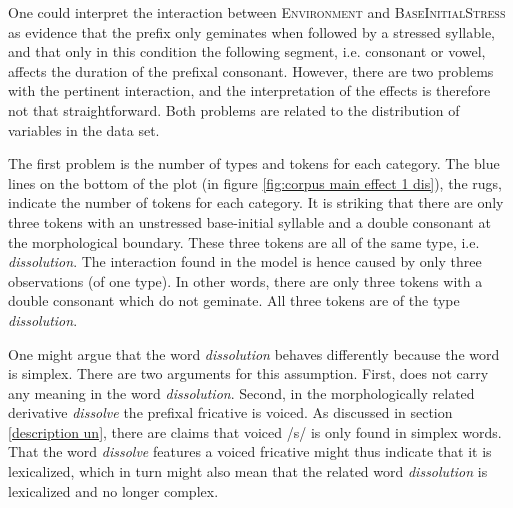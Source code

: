 


One could interpret the interaction between \textsc{Environment} and \textsc{BaseInitialStress} as evidence that the prefix  only geminates when followed by a stressed syllable, and that only in this condition the following segment, i.e. consonant or vowel, affects the duration of the prefixal consonant. However, there are two problems with the pertinent interaction, and the interpretation of the effects is therefore not that straightforward. Both problems are related to the distribution of variables in the data set. 

The first problem is the number of types and tokens for each category. The blue lines on the bottom of the plot (in figure \ref{fig:corpus main effect 1 dis}), the rugs, indicate the number of tokens for each category. It is striking that there are only three tokens with an unstressed base-initial syllable and a double consonant at the morphological boundary. These three tokens are all of the same type, i.e. \textit{dissolution}. The interaction found in the model is hence caused by only three observations (of one type). In other words, there are only three tokens with a double consonant which do not geminate. All three tokens are of the type \textit{dissolution}. 

One might argue that the word \textit{dissolution} behaves differently because the word is simplex. There are two arguments for this assumption. First,  does not carry any meaning in the word \textit{dissolution}. Second, in the morphologically related derivative \textit{dissolve} the prefixal fricative is voiced. As discussed in section \ref{description un}, there are claims that voiced /s/ is only found in simplex words. That the word \textit{dissolve} features a voiced fricative might thus indicate that it is lexicalized, which in turn might also mean that the related word \textit{dissolution} is lexicalized and no longer complex.


